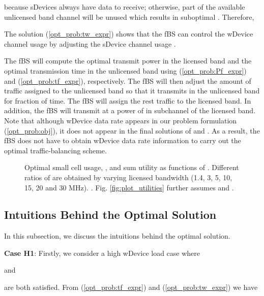 \documentclass[journal,final,letterpaper,10pt,doublecolumn,twoside]{IEEEtran}
\begin{document}
because sDevices always have data to receive; otherwise,  part of the available unlicensed band channel will be unused which results in suboptimal .
Therefore,

The solution (\ref{opt_prob:tw_expr}) shows that  the fBS can control the wDevice channel usage  by adjusting the sDevice channel usage .

The fBS will compute the optimal transmit power  in the licensed band and the optimal transmission time  in the unlicensed band using (\ref{opt_prob:Pf_expr}) and (\ref{opt_prob:tf_expr}), respectively. The fBS will then adjust the amount of traffic assigned to the unlicensed band so that it transmits in the unlicensed band for  fraction of time. The fBS will assign the rest traffic to the licensed band. In addition, the fBS will transmit at a power of   in subchannel  of the licensed band.  Note that although wDevice data rate  appears in our problem formulation (\ref{opt_prob:obj}), it does not appear in the final solutions of   and .
As a result, the fBS does not have to obtain wDevice data rate information to carry out the optimal traffic-balancing scheme.


\begin{figure*}[hpbt]
\centering {} \hfill
 \centering {}
\caption{ Optimal small cell usage, , and sum utility as functions of . Different ratios of  are obtained by varying licensed bandwidth (1.4, 3, 5, 10, 15, 20 and 30 MHz). . Fig. \ref{fig:plot_utilities} further assumes  and . } \label{fig:matlab_numerical_results}
\end{figure*}



\subsection{Intuitions Behind the Optimal Solution} \label{subsec:intuitions}
In this subsection, we discuss the intuitions behind the optimal  solution.

\textbf{Case H1}: Firstly, we consider a high wDevice load case where

and

are both satisfied.
From (\ref{opt_prob:tf_expr})  and (\ref{opt_prob:tw_expr}) we have
\end{document}
